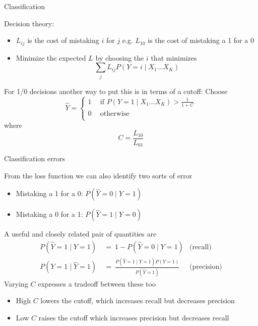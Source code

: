 \documentclass{hertieteaching}
\begin{document}
\begin{frame}{Classification}

Decision theory:
\begin{itemize}
  \item $L_{ij}$ is the cost of mistaking $i$ for $j$ e.g. $L_{10}$ is the cost of mistaking a 1 for a 0
  \item Minimize the expected $L$ by choosing the $i$ that minimizes
$$
\sum_j L_{ij} P(Y=i \mid X_1 \ldots X_K)
$$
\end{itemize}

For 1/0 decisions another way to put this is in terms of a cutoff: Choose
$$
\hat{Y} = 
\begin{cases}
    1~&~ \text{if } P(Y=1	 \mid X_1 \ldots X_K) > \frac{1}{1+C} \\
    0~&~ \text{otherwise}\\
\end{cases}
$$
where
$$
C  = \frac{L_{10}}{L_{01}}
$$

\end{frame}
\begin{frame}{Classification errors}

From the loss function we can also identify two sorts of error
\begin{itemize}
  \item Mistaking a 1 for a 0: $P(\hat{Y}=0 \mid Y=1)$
  \item Mistaking a 0 for a 1: $P(\hat{Y}=1 \mid Y=0)$
\end{itemize}
A useful and closely related pair of quantities are
\begin{align*}
P(\hat{Y}=1 \mid Y=1) & ~=~ 1-P(\hat{Y}=0 \mid Y=1) & \text{(recall)}\\
P(Y=1 \mid \hat{Y}=1) & ~=~ \frac{P(\hat{Y}=1 \mid Y=1)P(Y=1)}{P(\hat{Y}=1)} & \text{(precision)}
\end{align*}
Varying $C$ expresses a tradeoff between these too
\begin{itemize}
  \item High $C$ lowers the cutoff, which increases recall but decreases precision
  \item Low $C$ raises the cutoff which increases precision but decreases recall
\end{itemize}

\end{frame}
\end{document}
